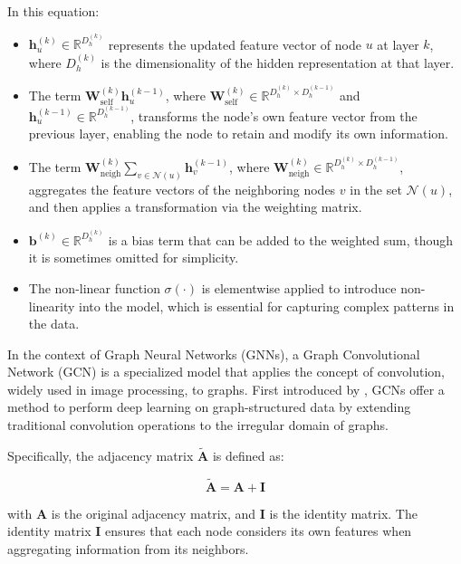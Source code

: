 \noindent In this equation:
\begin{itemize}
    \item \( \mathbf{h}_u^{(k)} \in \mathbb{R}^{D_h^{(k)}} \) represents the updated feature vector of node \( u \) at layer \( k \), where \( D_h^{(k)} \) is the dimensionality of the hidden representation at that layer.
    \item The term \( \mathbf{W}_{\text{self}}^{(k)} \mathbf{h}_u^{(k-1)} \), where \( \mathbf{W}_{\text{self}}^{(k)} \in \mathbb{R}^{D_h^{(k)} \times D_h^{(k-1)}} \) and \( \mathbf{h}_u^{(k-1)} \in \mathbb{R}^{D_h^{(k-1)}} \), transforms the node's own feature vector from the previous layer, enabling the node to retain and modify its own information. 
    \item The term \( \mathbf{W}_{\text{neigh}}^{(k)} \sum_{v \in \mathcal{N}(u)} \mathbf{h}_v^{(k-1)} \), where \( \mathbf{W}_{\text{neigh}}^{(k)} \in \mathbb{R}^{D_h^{(k)} \times D_h^{(k-1)}} \), aggregates the feature vectors of the neighboring nodes \( v \) in the set \( \mathcal{N}(u) \), and then applies a transformation via the weighting matrix. 
    \item \( \mathbf{b}^{(k)} \in \mathbb{R}^{D_h^{(k)}} \) is a bias term that can be added to the weighted sum, though it is sometimes omitted for simplicity. 
    \item The non-linear function \( \sigma(\cdot) \) is elementwise applied to introduce non-linearity into the model, which is essential for capturing complex patterns in the data.
\end{itemize}

In the context of Graph Neural Networks (GNNs), a Graph Convolutional Network (GCN) is a specialized model that applies the concept of convolution, widely used in image processing, to graphs. First introduced by \cite{Kipf:2016tc}, GCNs offer a method to perform deep learning on graph-structured data by extending traditional convolution operations to the irregular domain of graphs.

Specifically, the adjacency matrix \( \tilde{\mathbf{A}} \) is defined as:

\begin{equation}
 \tilde{\mathbf{A}} = \mathbf{A} + \mathbf{I}   
    \label{eq:modified_adjacency_matrix}
\end{equation}

\noindent with \( \mathbf{A} \) is the original adjacency matrix, and \( \mathbf{I} \) is the identity matrix. The identity matrix \( \mathbf{I} \) ensures that each node considers its own features when aggregating information from its neighbors.


